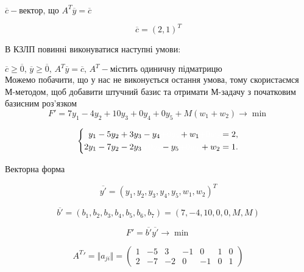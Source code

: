\documentclass[a4paper, 12pt]{article}
\begin{document}
$ \overline{c} - \text{вектор, що } A^T\overline{y} = \overline{c} $

\begin{equation*}
 \overline{c} = \left(2, 1 \right)^T
\end{equation*}

В КЗЛП повинні виконуватися наступні умови:

$\overline{c} \geqslant \overline{0} \text{, } \overline{y} \geqslant \overline{0} \text{, } A^T\overline{y} = \overline{c} \text{, } A^T - \text{містить одиничну підматрицю}$\\

Можемо побачити, що у нас не виконується остання умова, тому скористаємся М-методом, щоб добавити штучний базис та отримати М-задачу з початковим базисним роз'язком\\

\begin{equation*}
F' = 7y_1 - 4y_2 + 10y_3 + 0y_4 + 0y_5 + M(w_1 + w_2) \rightarrow \min
\end{equation*}


\begin{equation*}
\left\{
\begin{aligned}
	y_1 &- 5y_2 + 3y_3 - y_4 \textcolor{white}{+ 0y_5} + w_1 \textcolor{white}{+ 0w_2} = 2,\\
	2y_1 &- 7y_2 - 2y_3 \textcolor{white}{+ 0y_4} - y_5 \textcolor{white}{+ 0w_1} + w_2 = 1.
\end{aligned}
\right.
\end{equation*}

Векторна форма

\begin{equation*}
\overline{y'} = \left(y_1, y_2, y_3, y_4, y_5, w_1, w_2\right)^T
\end{equation*}

\begin{equation*}
\overline{b'} = \left(b_1, b_2, b_3, b_4, b_5, b_6, b_7\right) = (7,-4,10,0,0,M,M)
\end{equation*}

\begin{equation*}
F' = \overline{b'}\overline{y'} \rightarrow \min
\end{equation*}

\begin{equation*}
A^T{'} = \Vert a_{ji} \Vert = 
\begin{pmatrix}
	1 & -5 & 3 & -1 & 0 & 1 & 0\\
	2 & -7 & -2 & 0 & -1 & 0 & 1
\end{pmatrix}
\end{equation*}
\end{document}
